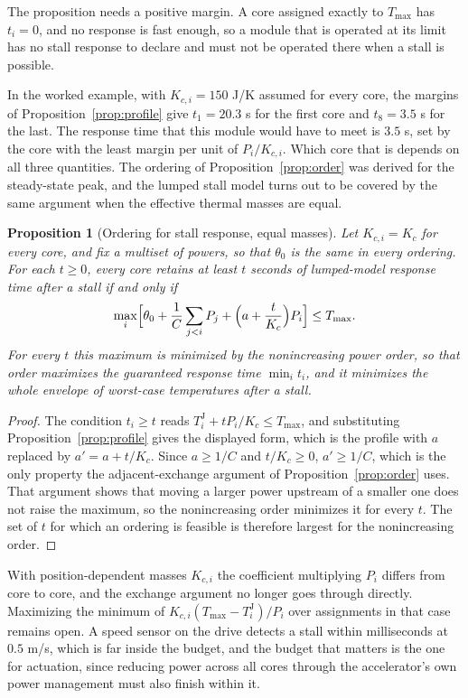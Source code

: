 \documentclass[11pt,openany]{book}
\theoremstyle{plain}
\newtheorem{proposition}[theorem]{Proposition}
\theoremstyle{definition}
\theoremstyle{remark}
\begin{document}
The proposition needs a positive margin. A core assigned exactly to $T_{\max}$ has $t_i=0$, and no response is fast enough, so a module that is operated at its limit has no stall response to declare and must not be operated there when a stall is possible.

In the worked example, with $K_{c,i}=150$ J/K assumed for every core, the margins of Proposition~\ref{prop:profile} give $t_1=20.3$ s for the first core and $t_8=3.5$ s for the last. The response time that this module would have to meet is $3.5$ s, set by the core with the least margin per unit of $P_i/K_{c,i}$. Which core that is depends on all three quantities. The ordering of Proposition~\ref{prop:order} was derived for the steady-state peak, and the lumped stall model turns out to be covered by the same argument when the effective thermal masses are equal.

\begin{proposition}[Ordering for stall response, equal masses]
\label{prop:stallorder}
Let $K_{c,i}=K_c$ for every core, and fix a multiset of powers, so that $\theta_0$ is the same in every ordering. For each $t\ge0$, every core retains at least $t$ seconds of lumped-model response time after a stall if and only if
\[
\max_i\Bigl[\theta_0+\frac1C\sum_{j<i}P_j+\Bigl(a+\frac{t}{K_c}\Bigr)P_i\Bigr]\le T_{\max}.
\]
For every $t$ this maximum is minimized by the nonincreasing power order, so that order maximizes the guaranteed response time $\min_it_i$, and it minimizes the whole envelope of worst-case temperatures after a stall.
\end{proposition}
\begin{proof}
The condition $t_i\ge t$ reads $T^{\mathrm J}_i+tP_i/K_c\le T_{\max}$, and substituting Proposition~\ref{prop:profile} gives the displayed form, which is the profile with $a$ replaced by $a'=a+t/K_c$. Since $a\ge1/C$ and $t/K_c\ge0$, $a'\ge1/C$, which is the only property the adjacent-exchange argument of Proposition~\ref{prop:order} uses. That argument shows that moving a larger power upstream of a smaller one does not raise the maximum, so the nonincreasing order minimizes it for every $t$. The set of $t$ for which an ordering is feasible is therefore largest for the nonincreasing order.
\end{proof}

With position-dependent masses $K_{c,i}$ the coefficient multiplying $P_i$ differs from core to core, and the exchange argument no longer goes through directly. Maximizing the minimum of $K_{c,i}(T_{\max}-T^{\mathrm J}_i)/P_i$ over assignments in that case remains open. A speed sensor on the drive detects a stall within milliseconds at $0.5$ m/s, which is far inside the budget, and the budget that matters is the one for actuation, since reducing power across all cores through the accelerator's own power management must also finish within it.
\end{document}
